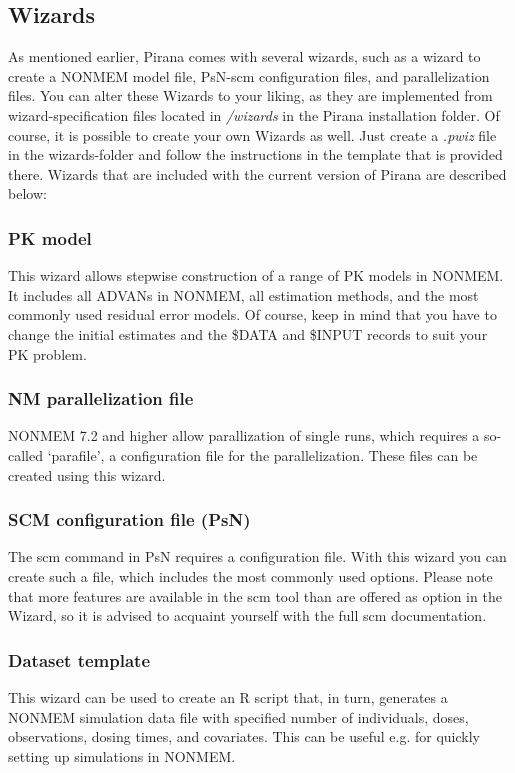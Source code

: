 {{{{\subsection{Wizards}
As mentioned earlier, Pirana comes with several wizards, such as a
wizard to create a NONMEM model file, PsN-scm configuration files, and
parallelization files. You can alter these Wizards to your liking, as they are
implemented from wizard-specification files located in
\textit{/wizards} in the Pirana installation folder. Of course, it
is possible to create your own Wizards as well. Just create a
\textit{.pwiz} file in the wizards-folder and follow the instructions
in the template that is provided there. Wizards that are included with
the current version of Pirana are described below:

\subsubsection*{PK model}
This wizard allows stepwise construction of a range of PK models in
NONMEM. It includes all ADVANs in NONMEM, all estimation methods, and
the most commonly used residual error models. Of course, keep in mind
that you have to change the initial estimates and the \$DATA and
\$INPUT records to suit your PK problem.

\subsubsection*{NM parallelization file}
NONMEM 7.2 and higher allow parallization of single runs, which
requires a so-called `parafile', a configuration file for the
parallelization. These files can be created using this wizard.

\subsubsection*{SCM configuration file (PsN)}
The scm command in PsN requires a configuration file. With this wizard
you can create such a file, which includes the most commonly used
options. Please note that more features are available in the scm tool
than are offered as option in the Wizard, so it is advised to acquaint
yourself with the full scm documentation.

\subsubsection*{Dataset template}
This wizard can be used to create an R script that, in turn, generates
a NONMEM simulation data file with specified number of individuals,
doses, observations, dosing times, and covariates. This can be useful
e.g. for quickly setting up simulations in NONMEM.

}}}}
